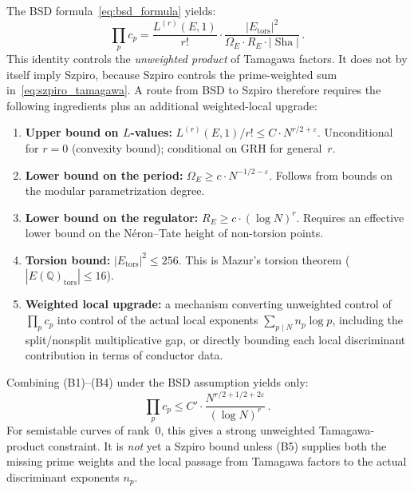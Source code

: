 \documentclass[aps,prd,twocolumn,superscriptaddress,nofootinbib,floatfix]{revtex4-2}
\theoremstyle{definition}
\theoremstyle{remark}
\DeclareMathOperator{\Sha}{Sha}
\begin{document}
The BSD formula~\eqref{eq:bsd_formula} yields:
\begin{equation}
\prod_p c_p = \frac{L^{(r)}(E,1)}{r!} \cdot \frac{|E_{\mathrm{tors}}|^2}{\Omega_E \cdot R_E \cdot |\Sha|}\,.
\label{eq:tamagawa_from_bsd}
\end{equation}
This identity controls the \emph{unweighted product} of Tamagawa factors.  It does not by itself imply Szpiro, because Szpiro controls the prime-weighted sum in~\eqref{eq:szpiro_tamagawa}.  A route from BSD to Szpiro therefore requires the following ingredients plus an additional weighted-local upgrade:
\begin{enumerate}
\item[\textbf{(B1)}] \textbf{Upper bound on $L$-values:} $L^{(r)}(E,1)/r! \leq C \cdot N^{r/2 + \varepsilon}$.  Unconditional for $r = 0$ (convexity bound); conditional on GRH for general~$r$.
\item[\textbf{(B2)}] \textbf{Lower bound on the period:} $\Omega_E \geq c \cdot N^{-1/2 - \varepsilon}$.  Follows from bounds on the modular parametrization degree.
\item[\textbf{(B3)}] \textbf{Lower bound on the regulator:} $R_E \geq c \cdot (\log N)^r$.  Requires an effective lower bound on the Néron--Tate height of non-torsion points.
\item[\textbf{(B4)}] \textbf{Torsion bound:} $|E_{\mathrm{tors}}|^2 \leq 256$.  This is Mazur's torsion theorem ($|E(\mathbb{Q})_{\mathrm{tors}}| \leq 16$).
\item[\textbf{(B5)}] \textbf{Weighted local upgrade:} a mechanism converting unweighted control of $\prod_p c_p$ into control of the actual local exponents $\sum_{p\mid N}n_p\log p$, including the split/nonsplit multiplicative gap, or directly bounding each local discriminant contribution in terms of conductor data.
\end{enumerate}
Combining (B1)--(B4) under the BSD assumption yields only:
\begin{equation}
\prod_p c_p \leq C' \cdot \frac{N^{r/2 + 1/2 + 2\varepsilon}}{(\log N)^r}\,.
\label{eq:tamagawa_bound}
\end{equation}
For semistable curves of rank~$0$, this gives a strong unweighted Tamagawa-product constraint.  It is \emph{not} yet a Szpiro bound unless (B5) supplies both the missing prime weights and the local passage from Tamagawa factors to the actual discriminant exponents $n_p$.
\end{document}
